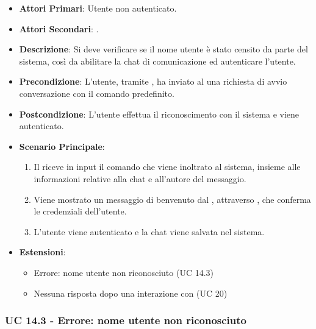 	\begin{itemize}
		\item \textbf{Attori Primari}: Utente non autenticato.
		\item \textbf{Attori Secondari}: .
		\item \textbf{Descrizione}: Si deve verificare se il nome utente è stato censito da parte del sistema, così da abilitare la chat di comunicazione ed autenticare l'utente.
		\item \textbf{Precondizione}: L'utente, tramite , ha inviato al  una richiesta di avvio conversazione con il comando predefinito.
		\item \textbf{Postcondizione}: L'utente effettua il riconoscimento con il sistema e viene autenticato.
		\item \textbf{Scenario Principale}:
		\begin{enumerate}
			\item Il   riceve in input il comando che viene inoltrato al sistema, insieme alle informazioni relative alla chat e all'autore del messaggio.
			\item Viene mostrato un messaggio di benvenuto dal , attraverso , che conferma le credenziali dell'utente.
			\item L'utente viene autenticato e la chat viene salvata nel sistema.
		\end{enumerate}
		\item \textbf{Estensioni}:
		\begin{itemize}
			\item Errore: nome utente  non riconosciuto (UC 14.3)
			\item Nessuna risposta dopo una interazione con  (UC 20)
		\end{itemize}
	\end{itemize}

	\subsubsection{UC 14.3 - Errore: nome utente  non riconosciuto}

